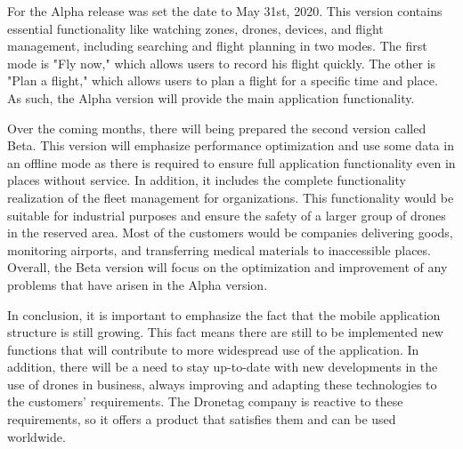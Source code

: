 For the Alpha release was set the date to May 31st, 2020.
This version contains essential functionality like watching zones, drones, devices, and flight management, including searching and flight planning in two modes.
The first mode is "Fly now," which allows users to record his flight quickly.
The other is "Plan a flight," which allows users to plan a flight for a specific time and place.
As such, the Alpha version will provide the main application functionality.

Over the coming months, there will being prepared the second version called Beta.
This version will emphasize performance optimization and use some data in an offline mode as there is required to ensure full application functionality even in places without service.
In addition, it includes the complete functionality realization of the fleet management for organizations.
This functionality would be suitable for industrial purposes and ensure the safety of a larger group of drones in the reserved area.
Most of the customers would be companies delivering goods, monitoring airports, and transferring medical materials to inaccessible places.
Overall, the Beta version will focus on the optimization and improvement of any problems that have arisen in the Alpha version.

In conclusion, it is important to emphasize the fact that the mobile application structure is still growing.
This fact means there are still to be implemented new functions that will contribute to more widespread use of the application.
In addition, there will be a need to stay up-to-date with new developments in the use of drones in business, always improving and adapting these technologies to the customers' requirements.
The Dronetag company is reactive to these requirements, so it offers a product that satisfies them and can be used worldwide.
